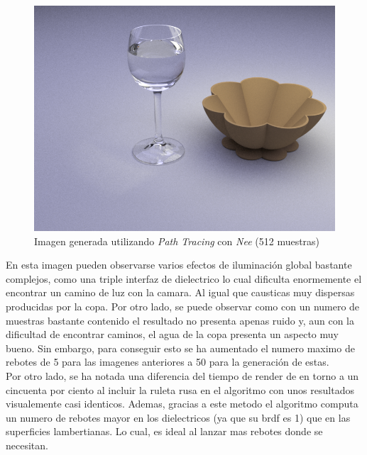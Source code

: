 \documentclass[10pt,oneside,a4paper]{article}
\begin{document}
\begin{figure}[h]
\centering
\includegraphics[width=.6\linewidth]{images/table_interesting_512.png}
\caption{Imagen generada utilizando \textit{Path Tracing} con \textit{Nee} (512 muestras) }
\label{fig:disp}
\end{figure}

En esta imagen pueden observarse varios efectos de iluminación global bastante complejos, como una triple interfaz de dielectrico lo cual dificulta enormemente el encontrar un camino de luz con la camara. Al igual que causticas muy dispersas producidas por la copa. Por otro lado, se puede observar como con un numero de muestras bastante contenido el resultado no presenta apenas ruido y, aun con la dificultad de encontrar caminos, el agua de la copa presenta un aspecto muy bueno. Sin embargo, para conseguir esto se ha aumentado el numero maximo de rebotes de 5 para las imagenes anteriores a 50 para la generación de estas. \\

Por otro lado, se ha notada una diferencia del tiempo de render de en torno a un cincuenta por ciento al incluir la ruleta rusa en el algoritmo con unos resultados visualemente casi identicos. Ademas, gracias a este metodo el algoritmo computa un numero de rebotes mayor en los dielectricos (ya que su brdf es 1) que en las superficies lambertianas. Lo cual, es ideal al lanzar mas rebotes donde se necesitan.
\end{document}
